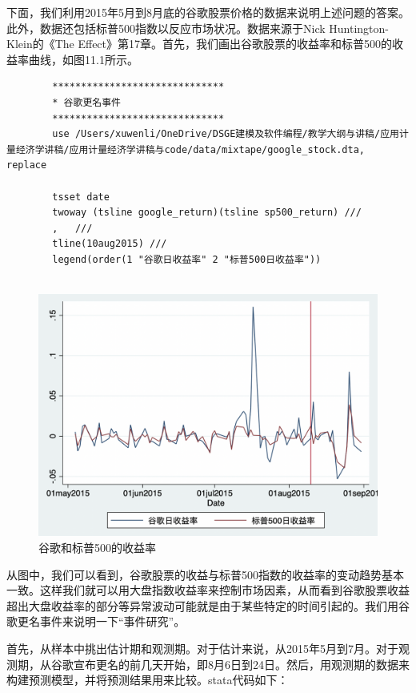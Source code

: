 \documentclass[cn,12pt,math=newtx,citestyle=gb7714-2015,bibstyle=gb7714-2015]{elegantbook}
\begin{document}
	下面，我们利用2015年5月到8月底的谷歌股票价格的数据来说明上述问题的答案。此外，数据还包括标普500指数以反应市场状况。数据来源于Nick Huntington-Klein的《The Effect》第17章。首先，我们画出谷歌股票的收益率和标普500的收益率曲线，如图11.1所示。
	
	\begin{lstlisting}
		******************************
		* 谷歌更名事件
		******************************
		use /Users/xuwenli/OneDrive/DSGE建模及软件编程/教学大纲与讲稿/应用计量经济学讲稿/应用计量经济学讲稿与code/data/mixtape/google_stock.dta, replace
		
		tsset date
		twoway (tsline google_return)(tsline sp500_return) ///
		,	///
		tline(10aug2015) ///
		legend(order(1 "谷歌日收益率" 2 "标普500日收益率"))
		
	\end{lstlisting}
	
	\begin{figure}[tbph]
		\centering
		\includegraphics[width=1\linewidth]{google}
		\caption{谷歌和标普500的收益率}
		\label{fig:google}
	\end{figure}
	
	从图中，我们可以看到，谷歌股票的收益与标普500指数的收益率的变动趋势基本一致。这样我们就可以用大盘指数收益率来控制市场因素，从而看到谷歌股票收益超出大盘收益率的部分等异常波动可能就是由于某些特定的时间引起的。我们用谷歌更名事件来说明一下“事件研究”。
	
	首先，从样本中挑出估计期和观测期。对于估计来说，从2015年5月到7月。对于观测期，从谷歌宣布更名的前几天开始，即8月6日到24日。然后，用观测期的数据来构建预测模型，并将预测结果用来比较。stata代码如下：
	
\end{document}
